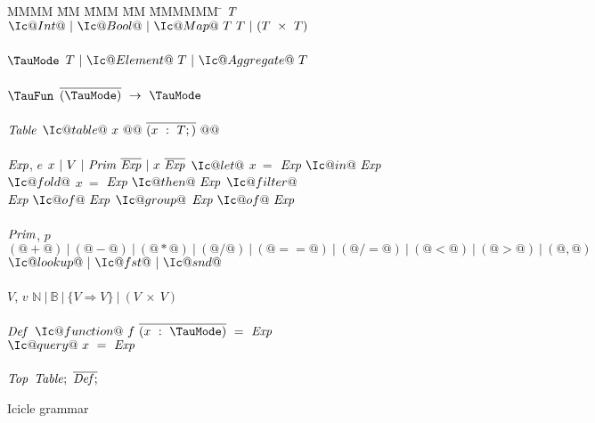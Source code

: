 
\begin{figure}
  \begin{center}
  \begin{minipage}{0.4\textwidth}
\begin{tabbing}
MMMM \= MM \= MMM \= MM \= MMMMMM \= \kill
$\mathit{T}$
\GrammarDefTab
  $\Ic@Int@~|~\Ic@Bool@~|~\Ic@Map@~T~T~|~(T~\times~T)$
\\
\\
$\mi{\TauMode}$
\GrammarDefTab
  $T~|~\Ic@Element@~T~|~\Ic@Aggregate@~T$
\\
\\
$\mi{\TauFun}$
\GrammarDefTab
  $\ov{(\TauMode)}~\to~\TauMode$
\\
\\

$\mathit{Table}$
\GrammarDefTab
  $\Ic@table@~x~@{@~\ov{(x~:~T;)}~@}@$
\\
\\

$\mathit{Exp}$, $e$
\GrammarDefTab
  $x~|~V~|~\mathit{Prim}~\overline{\mathit{Exp}}~|~x~\overline{\mathit{Exp}}$
\GrammarAlt
  $\Ic@let@$   \> $x~=$ \> $\mi{Exp}~\Ic@  in@~\mi{Exp}$
\GrammarAlt
  $\Ic@fold@$  \> $x~=$ \> $\mi{Exp}~\Ic@then@~\mi{Exp}$
\GrammarAlt
  $\Ic@filter@$\> \> $\mi{Exp}~\Ic@  of@~\mi{Exp}$
\GrammarAlt
  $\Ic@group@$ \> \> $\mi{Exp}~\Ic@  of@~\mi{Exp}$
\\
\\

$\mathit{Prim}$, $p$
\GrammarDefTab
  $(@+@)~|~(@-@)~|~(@*@)~|~(@/@)~|~(@==@)~|~(@/=@)~|~(@<@)~|~(@>@)~|~(@,@)$
\GrammarAlt
  $\Ic@lookup@~|~\Ic@fst@~|~\Ic@snd@$
\\
\\

$V$, $v$
\GrammarDefTab
 $\mathbb{N}~|~\mathbb{B}~|~\{V \Rightarrow V\}~|~(V~\times~V)$
\\
\\


$\mathit{Def}$
\GrammarDefTab
  $\Ic@function@~f~\ov{(x~:~\TauMode)}~=~\mi{Exp}$
\GrammarAlt
  $\Ic@query@~x~=~\mi{Exp}$
\\
\\
$\mathit{Top}$
\GrammarDefTab
  $\mathit{Table};~\overline{\mathit{Def};}$
\end{tabbing}
\end{minipage}
  \end{center}

\caption{Icicle grammar}
\label{icicle:fig:source:grammar}
\end{figure}

